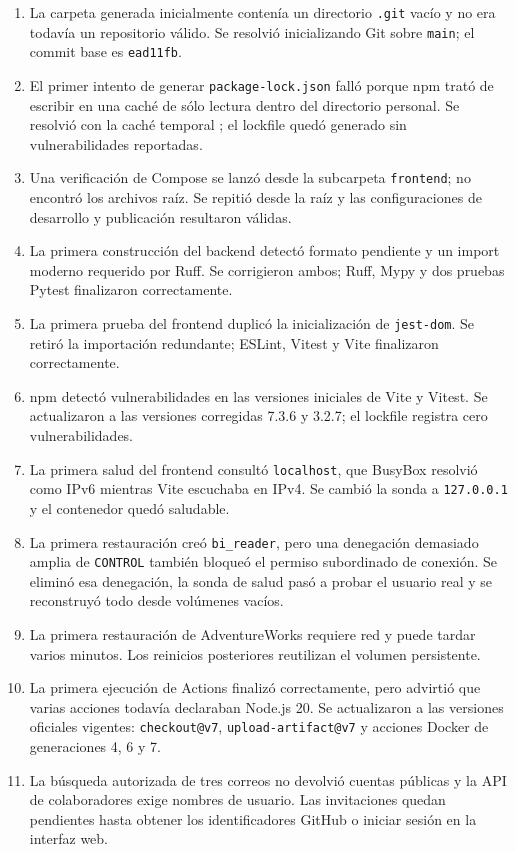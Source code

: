 \documentclass[11pt,letterpaper]{article}
\newcommand{\file}[1]{\texttt{#1}}
\begin{document}
\begin{enumerate}
  \item La carpeta generada inicialmente contenía un directorio \file{.git} vacío y no era todavía un repositorio válido. Se resolvió inicializando Git sobre \file{main}; el commit base es \file{ead11fb}.
  \item El primer intento de generar \file{package-lock.json} falló porque npm trató de escribir en una caché de sólo lectura dentro del directorio personal. Se resolvió con la caché temporal ; el lockfile quedó generado sin vulnerabilidades reportadas.
  \item Una verificación de Compose se lanzó desde la subcarpeta \file{frontend}; no encontró los archivos raíz. Se repitió desde la raíz y las configuraciones de desarrollo y publicación resultaron válidas.
  \item La primera construcción del backend detectó formato pendiente y un import moderno requerido por Ruff. Se corrigieron ambos; Ruff, Mypy y dos pruebas Pytest finalizaron correctamente.
  \item La primera prueba del frontend duplicó la inicialización de \file{jest-dom}. Se retiró la importación redundante; ESLint, Vitest y Vite finalizaron correctamente.
  \item npm detectó vulnerabilidades en las versiones iniciales de Vite y Vitest. Se actualizaron a las versiones corregidas 7.3.6 y 3.2.7; el lockfile registra cero vulnerabilidades.
  \item La primera salud del frontend consultó \file{localhost}, que BusyBox resolvió como IPv6 mientras Vite escuchaba en IPv4. Se cambió la sonda a \file{127.0.0.1} y el contenedor quedó saludable.
  \item La primera restauración creó \file{bi\_reader}, pero una denegación demasiado amplia de \file{CONTROL} también bloqueó el permiso subordinado de conexión. Se eliminó esa denegación, la sonda de salud pasó a probar el usuario real y se reconstruyó todo desde volúmenes vacíos.
  \item La primera restauración de AdventureWorks requiere red y puede tardar varios minutos. Los reinicios posteriores reutilizan el volumen persistente.
  \item La primera ejecución de Actions finalizó correctamente, pero advirtió que varias acciones todavía declaraban Node.js 20. Se actualizaron a las versiones oficiales vigentes: \file{checkout@v7}, \file{upload-artifact@v7} y acciones Docker de generaciones 4, 6 y 7.
  \item La búsqueda autorizada de tres correos no devolvió cuentas públicas y la API de colaboradores exige nombres de usuario. Las invitaciones quedan pendientes hasta obtener los identificadores GitHub o iniciar sesión en la interfaz web.
\end{enumerate}
\end{document}
